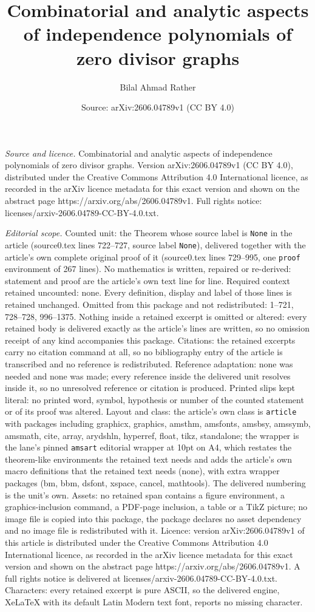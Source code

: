 \documentclass[10pt,a4paper]{amsart}
\title[Combinatorial and analytic aspects of independence polynomia]{Combinatorial and analytic aspects of independence polynomials of zero divisor graphs}
\author{Bilal Ahmad Rather}
\date{Source: arXiv:2606.04789v1 (CC BY 4.0)}
\begin{document}
\maketitle

\noindent\emph{Source and licence.} Combinatorial and analytic aspects of independence polynomials of zero divisor graphs. Version arXiv:2606.04789v1 (CC BY 4.0), distributed under the Creative Commons Attribution 4.0 International licence, as recorded in the arXiv licence metadata for this exact version and shown on the abstract page https://arxiv.org/abs/2606.04789v1. Full rights notice: licenses/arxiv-2606.04789-CC-BY-4.0.txt.\par\smallskip

\noindent\textit{Editorial scope.} Counted unit: the Theorem whose source label is \texttt{None} in the article (source0.tex lines 722--727, source label \texttt{None}), delivered together with the article's own complete original proof of it (source0.tex lines 729--995, one \texttt{proof} environment of 267 lines). No mathematics is written, repaired or re-derived: statement and proof are the article's own text line for line. Required context retained uncounted: none. Every definition, display and label of those lines is retained unchanged. Omitted from this package and not redistributed: 1--721, 728--728, 996--1375. Nothing inside a retained excerpt is omitted or altered: every retained body is delivered exactly as the article's lines are written, so no omission receipt of any kind accompanies this package. Citations: the retained excerpts carry no citation command at all, so no bibliography entry of the article is transcribed and no reference is redistributed. Reference adaptation: none was needed and none was made; every reference inside the delivered unit resolves inside it, so no unresolved reference or citation is produced. Printed slips kept literal: no printed word, symbol, hypothesis or number of the counted statement or of its proof was altered. Layout and class: the article's own class is \texttt{article} with packages including graphicx, graphics, amsthm, amsfonts, amsbsy, amssymb, amsmath, cite, array, arydshln, hyperref, float, tikz, standalone; the wrapper is the lane's pinned \texttt{amsart} editorial wrapper at 10pt on A4, which restates the theorem-like environments the retained text needs and adds the article's own macro definitions that the retained text needs (none), with extra wrapper packages (bm, bbm, dsfont, xspace, cancel, mathtools). The delivered numbering is the unit's own. Assets: no retained span contains a figure environment, a graphics-inclusion command, a PDF-page inclusion, a table or a TikZ picture; no image file is copied into this package, the package declares no asset dependency and no image file is redistributed with it. Licence: version arXiv:2606.04789v1 of this article is distributed under the Creative Commons Attribution 4.0 International licence, as recorded in the arXiv licence metadata for this exact version and shown on the abstract page https://arxiv.org/abs/2606.04789v1. A full rights notice is delivered at licenses/arxiv-2606.04789-CC-BY-4.0.txt. Characters: every retained excerpt is pure ASCII, so the delivered engine, XeLaTeX with its default Latin Modern text font, reports no missing character.
\end{document}
